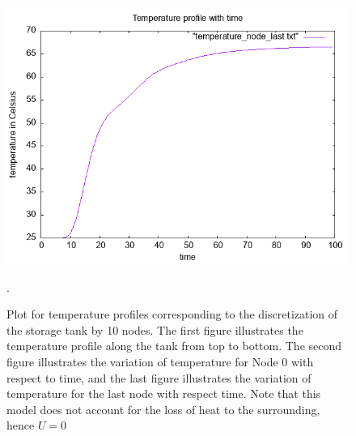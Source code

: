 \documentclass{article}
\begin{document}
\begin{figure}[ht]
\includegraphics[scale =0.5]{temperature_node_last_u_0.png}
\caption{Plot for temperature profiles corresponding to the discretization of the storage tank by 10 nodes. The first figure illustrates the temperature profile along the tank from top to bottom. The second figure illustrates the variation of temperature for Node 0 with respect to time, and the last figure illustrates the variation of temperature for the last node with respect time. Note that this model does not account for the loss of heat to the surrounding, hence $U =  0$}.
\end{figure}
\end{document}
